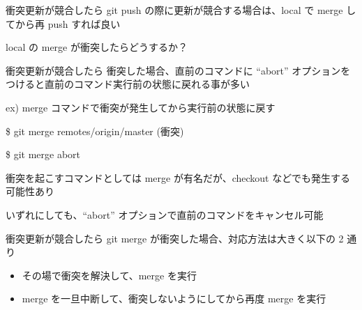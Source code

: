 
\begin{frame}[t]{衝突}{更新が競合したら}
  git push の際に更新が競合する場合は、local で merge してから再 push すれば良い
  \vspace{4ex}

  local の merge が衝突したらどうするか？
\end{frame}


\begin{frame}[t]{衝突}{更新が競合したら}
  衝突した場合、直前のコマンドに ``{\dhyphen}abort'' オプションをつけると直前のコマンド実行前の状態に戻れる事が多い
  \vspace{4ex}

  ex)
  merge コマンドで衝突が発生してから実行前の状態に戻す

  \$ git merge remotes/origin/master (衝突)

  \$ git merge {\dhyphen}abort
  \vspace{4ex}

  衝突を起こすコマンドとしては merge が有名だが、checkout などでも発生する可能性あり

  いずれにしても、``{\dhyphen}abort'' オプションで直前のコマンドをキャンセル可能
\end{frame}


\begin{frame}[t]{衝突}{更新が競合したら}
  git merge が衝突した場合、対応方法は大きく以下の 2 通り
  \vspace{2ex}

  \begin{itemize}
  \item その場で衝突を解決して、merge を実行
  \item merge を一旦中断して、衝突しないようにしてから再度 merge を実行
  \end{itemize}
  \vspace{4ex}

\end{frame}


